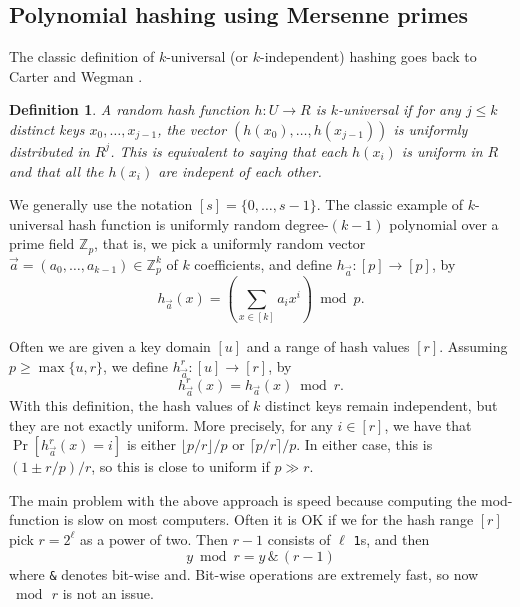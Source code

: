 \documentclass[12pt]{article}
\newtheorem {definition} {Definition}
\newcommand\fct\rightarrow
\newcommand\Z{\mathbb Z}
\begin{document}
\subsection{Polynomial hashing using Mersenne primes}
The classic definition of $k$-universal (or $k$-independent) hashing
goes back to Carter and Wegman \cite{wegman81kwise}.
\begin{definition}
A random hash function $h:U\fct R$ is $k$-universal if for any $j\leq k$
distinct keys $x_0,\ldots,x_{j-1}$, the vector
$(h(x_0),\ldots,h(x_{j-1}))$ is uniformly distributed in $R^j$. This
is equivalent to saying that each $h(x_i)$ is uniform in $R$ and that
all the $h(x_i)$ are indepent of each other.
\end{definition}
We generally use the notation $[s]=\{0,\ldots,s-1\}$.
The classic example of $k$-universal
hash function is uniformly random degree-$(k-1)$ polynomial over a prime field
$\Z_p$, that is, we pick a uniformly random vector
$\vec a=(a_0,\ldots,a_{k-1})\in \Z_p^k$ of $k$ coefficients, and define
$h_{\vec a}:[p]\fct[p]$, by 
\[h_{\vec a}(x)=\left(\sum_{x\in[k]}a_i x^i\right)\bmod p.\]

Often we are given a key domain $[u]$ and a range of hash values $[r]$. Assuming $p\geq \max\{u,r\}$, we define
$h^r_{\vec a}:[u]\fct[r]$, by
\[h^r_{\vec a}(x)=h_{\vec a}(x)\bmod r.\]
With this definition, the hash values of $k$ distinct keys 
remain independent, but they are not exactly uniform. More
precisely, for any $i\in[r]$, we have that
$\Pr[h_{\vec a}^r(x)=i]$ is
either $\lfloor p/r\rfloor/p$ or $\lceil p/r\rceil/p$. In
either case, this is $(1\pm r/p)/r$, so this is close to uniform if
$p\gg r$.


The main problem with the above approach is speed because computing
the mod-function is slow on most computers. Often it
is OK if we for the hash range $[r]$ pick $r=2^\ell$ as a power of two.
Then $r-1$ consists of $\ell$ \texttt1s, and then 
\[y\bmod r=y\,\texttt\&\,(r-1)\]
where \texttt\& denotes bit-wise {\sc and}. Bit-wise operations are
extremely fast, so now $\bmod\,r$ is not an issue.
\end{document}
